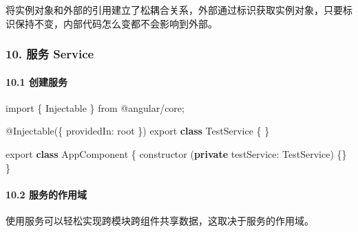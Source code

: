 \documentclass[
]{article}
\newenvironment{Shaded}{}{}
\newcommand{\DataTypeTok}[1]{\textcolor[rgb]{0.56,0.13,0.00}{#1}}
\newcommand{\FunctionTok}[1]{\textcolor[rgb]{0.02,0.16,0.49}{#1}}
\newcommand{\ImportTok}[1]{#1}
\newcommand{\KeywordTok}[1]{\textcolor[rgb]{0.00,0.44,0.13}{\textbf{#1}}}
\newcommand{\NormalTok}[1]{#1}
\newcommand{\OperatorTok}[1]{\textcolor[rgb]{0.40,0.40,0.40}{#1}}
\newcommand{\StringTok}[1]{\textcolor[rgb]{0.25,0.44,0.63}{#1}}
\begin{document}
将实例对象和外部的引用建立了松耦合关系，外部通过标识获取实例对象，只要标识保持不变，内部代码怎么变都不会影响到外部。

\hypertarget{10-ux670dux52a1-service}{%
\subsubsection{10. 服务 Service}\label{10-ux670dux52a1-service}}

\hypertarget{101-ux521bux5efaux670dux52a1}{%
\paragraph{10.1 创建服务}\label{101-ux521bux5efaux670dux52a1}}

\begin{Shaded}
\begin{Highlighting}[]
\ImportTok{import}\NormalTok{ \{ Injectable \} }\ImportTok{from} \StringTok{\textquotesingle{}@angular/core\textquotesingle{}}\OperatorTok{;}

\NormalTok{@}\FunctionTok{Injectable}\NormalTok{(\{}
  \DataTypeTok{providedIn}\OperatorTok{:} \StringTok{\textquotesingle{}root\textquotesingle{}}
\NormalTok{\})}
\ImportTok{export} \KeywordTok{class}\NormalTok{ TestService \{ \}}
\end{Highlighting}
\end{Shaded}

\begin{Shaded}
\begin{Highlighting}[]
\ImportTok{export} \KeywordTok{class}\NormalTok{ AppComponent \{}
 	\FunctionTok{constructor}\NormalTok{ (}\KeywordTok{private} \DataTypeTok{testService}\OperatorTok{:}\NormalTok{ TestService) \{\}}
\NormalTok{\}}
\end{Highlighting}
\end{Shaded}

\hypertarget{102-ux670dux52a1ux7684ux4f5cux7528ux57df}{%
\paragraph{10.2
服务的作用域}\label{102-ux670dux52a1ux7684ux4f5cux7528ux57df}}

使用服务可以轻松实现跨模块跨组件共享数据，这取决于服务的作用域。
\end{document}

